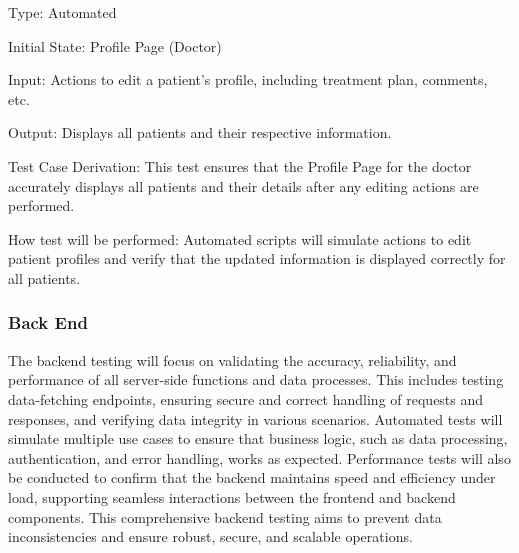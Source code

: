 \documentclass[12pt, titlepage]{article}
\begin{document}
\begin{enumerate}
Type: Automated
					
Initial State: Profile Page (Doctor)
					
Input: Actions to edit a patient's profile, including treatment plan, comments, etc.
					
Output: Displays all patients and their respective information.

Test Case Derivation: This test ensures that the Profile Page for the doctor accurately displays all patients and their details after any editing actions are performed.

How test will be performed: Automated scripts will simulate actions to edit patient profiles and verify that the updated information is displayed correctly for all patients.

\end{enumerate}

\subsubsection{Back End}

The backend testing will focus on validating the accuracy, reliability, and performance of all server-side functions and data processes. This includes testing data-fetching endpoints, ensuring secure and correct handling of requests and responses, and verifying data integrity in various scenarios. Automated tests will simulate multiple use cases to ensure that business logic, such as data processing, authentication, and error handling, works as expected. Performance tests will also be conducted to confirm that the backend maintains speed and efficiency under load, supporting seamless interactions between the frontend and backend components. This comprehensive backend testing aims to prevent data inconsistencies and ensure robust, secure, and scalable operations.
\end{document}
